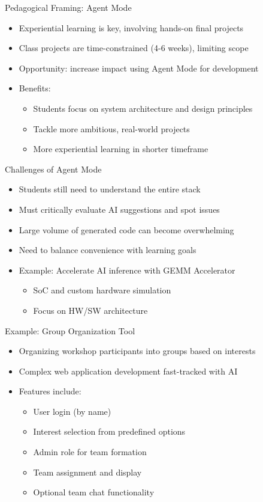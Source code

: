 \documentclass[xcolor={dvipsnames}, aspectratio=169]{beamer}
\begin{document}
\begin{frame}{Pedagogical Framing: Agent Mode}
  \begin{itemize}
    \item Experiential learning is key, involving hands-on final projects
    \item Class projects are time-constrained (4-6 weeks), limiting scope
    \item Opportunity: increase impact using Agent Mode for development
    \item Benefits:
      \begin{itemize}
        \item Students focus on system architecture and design principles
        \item Tackle more ambitious, real-world projects
        \item More experiential learning in shorter timeframe
      \end{itemize}
  \end{itemize}
\end{frame}

\begin{frame}{Challenges of Agent Mode}
  \begin{itemize}
    \item Students still need to understand the entire stack
    \item Must critically evaluate AI suggestions and spot issues
    \item Large volume of generated code can become overwhelming
    \item Need to balance convenience with learning goals
    \item Example: Accelerate AI inference with GEMM Accelerator 
      \begin{itemize}
        \item SoC and custom hardware simulation
        \item Focus on HW/SW architecture
      \end{itemize}
  \end{itemize}
\end{frame}

\begin{frame}{Example: Group Organization Tool}
  \begin{itemize}
    \item Organizing workshop participants into groups based on interests
    \item Complex web application development fast-tracked with AI
    \item Features include:
      \begin{itemize}
        \item User login (by name)
        \item Interest selection from predefined options
        \item Admin role for team formation
        \item Team assignment and display
        \item Optional team chat functionality
      \end{itemize}
  \end{itemize}
\end{frame}
\end{document}
